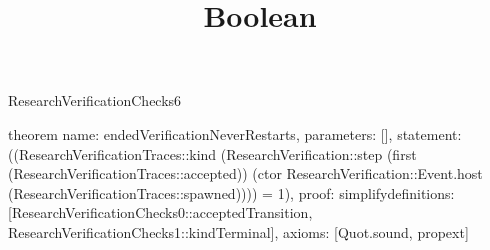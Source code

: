 \begin{lexlean}{ResearchVerificationChecks6}
\title{Boolean}
\begin{semanticmodule}
theorem{
  name: endedVerificationNeverRestarts,
  parameters: [],
  statement: ((ResearchVerificationTraces::kind (ResearchVerification::step (first (ResearchVerificationTraces::accepted)) (ctor ResearchVerification::Event.host  (ResearchVerificationTraces::spawned)))) = 1),
  proof: simplify{definitions: [ResearchVerificationChecks0::acceptedTransition, ResearchVerificationChecks1::kindTerminal]},
  axioms: [Quot.sound, propext]
}
\end{semanticmodule}
\end{lexlean}
